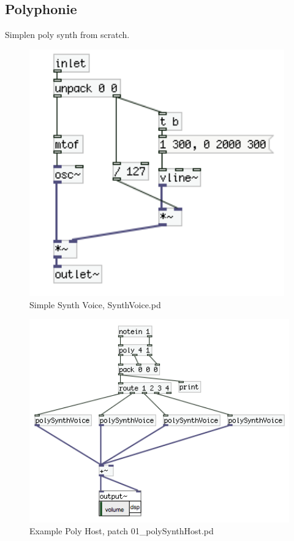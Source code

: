 \subsection{Polyphonie} %
\label{sub:polyphonie}

Simplen poly synth from scratch.

\begin{figure}[!h]
	\begin{center}
		\includegraphics[width = 11cm]{img/SynthVoice1.png}
		\caption{Simple Synth Voice, SynthVoice.pd}
		\label{fig:synthVoice1}
	\end{center}
\end{figure}

\begin{figure}[!htbp]
	\begin{center}
		\includegraphics[width = 12cm]{img/PolyHost.png}
		\caption{Example Poly Host, patch 01\_polySynthHost.pd}
		\label{fig:polyHost}
	\end{center}
\end{figure}


